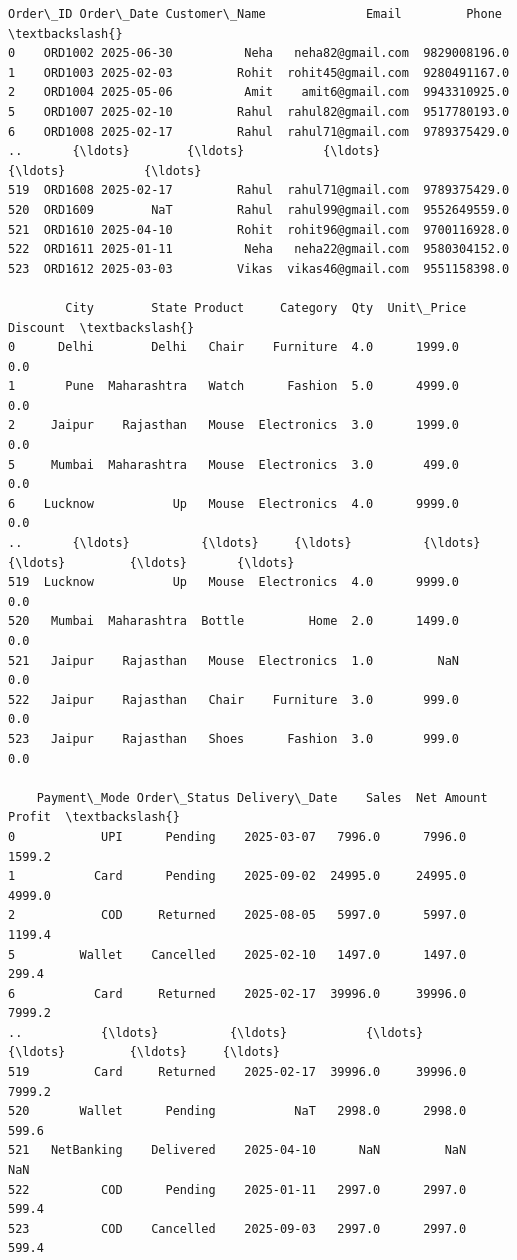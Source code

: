 \documentclass[11pt]{article}
\makeatletter
\newcommand{\boxspacing}{\kern\kvtcb@left@rule\kern\kvtcb@boxsep}
\newcommand{\prompt}[4]{
        {\ttfamily\llap{{\color{#2}[#3]:\hspace{3pt}#4}}\vspace{-\baselineskip}}
    }
\makeatother
\begin{document}
            \begin{tcolorbox}[breakable, size=fbox, boxrule=.5pt, pad at break*=1mm, opacityfill=0]
\prompt{Out}{outcolor}{47}{\boxspacing}
\begin{Verbatim}[commandchars=\\\{\}]
    Order\_ID Order\_Date Customer\_Name              Email         Phone  \textbackslash{}
0    ORD1002 2025-06-30          Neha   neha82@gmail.com  9829008196.0
1    ORD1003 2025-02-03         Rohit  rohit45@gmail.com  9280491167.0
2    ORD1004 2025-05-06          Amit    amit6@gmail.com  9943310925.0
5    ORD1007 2025-02-10         Rahul  rahul82@gmail.com  9517780193.0
6    ORD1008 2025-02-17         Rahul  rahul71@gmail.com  9789375429.0
..       {\ldots}        {\ldots}           {\ldots}                {\ldots}           {\ldots}
519  ORD1608 2025-02-17         Rahul  rahul71@gmail.com  9789375429.0
520  ORD1609        NaT         Rahul  rahul99@gmail.com  9552649559.0
521  ORD1610 2025-04-10         Rohit  rohit96@gmail.com  9700116928.0
522  ORD1611 2025-01-11          Neha   neha22@gmail.com  9580304152.0
523  ORD1612 2025-03-03         Vikas  vikas46@gmail.com  9551158398.0

        City        State Product     Category  Qty  Unit\_Price  Discount  \textbackslash{}
0      Delhi        Delhi   Chair    Furniture  4.0      1999.0       0.0
1       Pune  Maharashtra   Watch      Fashion  5.0      4999.0       0.0
2     Jaipur    Rajasthan   Mouse  Electronics  3.0      1999.0       0.0
5     Mumbai  Maharashtra   Mouse  Electronics  3.0       499.0       0.0
6    Lucknow           Up   Mouse  Electronics  4.0      9999.0       0.0
..       {\ldots}          {\ldots}     {\ldots}          {\ldots}  {\ldots}         {\ldots}       {\ldots}
519  Lucknow           Up   Mouse  Electronics  4.0      9999.0       0.0
520   Mumbai  Maharashtra  Bottle         Home  2.0      1499.0       0.0
521   Jaipur    Rajasthan   Mouse  Electronics  1.0         NaN       0.0
522   Jaipur    Rajasthan   Chair    Furniture  3.0       999.0       0.0
523   Jaipur    Rajasthan   Shoes      Fashion  3.0       999.0       0.0

    Payment\_Mode Order\_Status Delivery\_Date    Sales  Net Amount  Profit  \textbackslash{}
0            UPI      Pending    2025-03-07   7996.0      7996.0  1599.2
1           Card      Pending    2025-09-02  24995.0     24995.0  4999.0
2            COD     Returned    2025-08-05   5997.0      5997.0  1199.4
5         Wallet    Cancelled    2025-02-10   1497.0      1497.0   299.4
6           Card     Returned    2025-02-17  39996.0     39996.0  7999.2
..           {\ldots}          {\ldots}           {\ldots}      {\ldots}         {\ldots}     {\ldots}
519         Card     Returned    2025-02-17  39996.0     39996.0  7999.2
520       Wallet      Pending           NaT   2998.0      2998.0   599.6
521   NetBanking    Delivered    2025-04-10      NaN         NaN     NaN
522          COD      Pending    2025-01-11   2997.0      2997.0   599.4
523          COD    Cancelled    2025-09-03   2997.0      2997.0   599.4


\end{Verbatim}
\end{tcolorbox}
\end{document}
